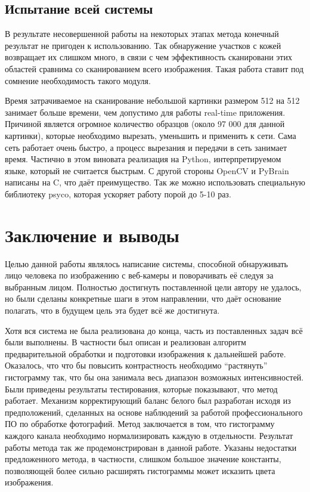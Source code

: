 \documentclass[12pt]{report}
\begin{document}
\section{Испытание всей системы}

В результате несовершенной работы на некоторых этапах метода конечный результат не пригоден к использованию. Так 
обнаружение участков с кожей возвращает их слишком много, в связи с чем эффективность сканировани этих областей 
сравнима со сканированием всего изображения. Такая работа ставит под сомнение необходимость такого модуля.

Время затрачиваемое на сканирование небольшой картинки размером 512 на 512 занимает больше времени, чем допустимо 
для  
работы real-time приложения. Причиной является огромное количество образцов (около 97 000 для данной картинки), 
которые необходимо вырезать, уменьшить и применить к сети. Сама сеть работает очень быстро, а процесс вырезания и 
передачи в сеть занимает время. Частично в этом виновата реализация на Python, интерпретируемом языке, который не 
считается быстрым. С другой стороны OpenCV и PyBrain написаны на C, что даёт преимущество. Так же можно 
использовать 
специальную библиотеку psyco, которая ускоряет работу порой до 5-10 раз.

\chapter*{Заключение и выводы}
\thispagestyle{fancy}

Целью данной работы являлось написание системы, способной обнаруживать лицо человека по изображению с веб-камеры и  
поворачивать её следуя за выбранным лицом. Полностью достигнуть поставленной цели автору не удалось, но были 
сделаны конкретные шаги в этом направлении, что даёт основание полагать, что в будущем цель эта будет всё же 
достигнута.

Хотя вся система не была реализована до конца, часть из поставленных задач всё были выполнены. В частности был 
описан и реализован алгоритм предварительной обработки и подготовки изображения к дальнейшей работе. Оказалось, что 
что бы повысить контрастность необходимо ``растянуть'' гистограмму так, что бы она занимала весь диапазон возможных 
интенсивностей. Были приведены результаты тестирования, которые показывают, что метод работает. Механизм 
корректирующий баланс белого был разработан исходя из предположений, сделанных на основе наблюдений за работой 
профессионального ПО по обработке фотографий. Метод заключается в том, что гистограмму каждого канала необходимо 
нормализировать каждую в отдельности. Результат работы метода так же продемонстрирован в данной работе. Указаны 
недостатки предложенного метода, в частности, слишком большое значение константы, позволяющей более сильно 
расширять гистограммы может исказить цвета изображения. 
\end{document}
